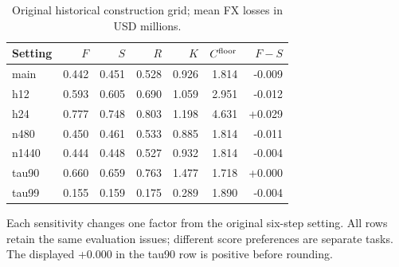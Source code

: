 \begin{table}[!htbp]
\centering\small
\caption{Original historical construction grid; mean FX losses in USD millions.}\label{tab:old}
\begin{tabular}{lrrrrrr}
\toprule
Setting & $F$ & $S$ & $R$ & $K$ & $C^{\rm floor}$ & $F-S$ \\
\midrule
main & 0.442 & 0.451 & 0.528 & 0.926 & 1.814 & -0.009 \\
h12 & 0.593 & 0.605 & 0.690 & 1.059 & 2.951 & -0.012 \\
h24 & 0.777 & 0.748 & 0.803 & 1.198 & 4.631 & +0.029 \\
n480 & 0.450 & 0.461 & 0.533 & 0.885 & 1.814 & -0.011 \\
n1440 & 0.444 & 0.448 & 0.527 & 0.932 & 1.814 & -0.004 \\
tau90 & 0.660 & 0.659 & 0.763 & 1.477 & 1.718 & +0.000 \\
tau99 & 0.155 & 0.159 & 0.175 & 0.289 & 1.890 & -0.004 \\
\bottomrule
\end{tabular}
\par\smallskip\begin{minipage}{\linewidth}\footnotesize Each sensitivity changes one factor from the original six-step setting. All rows retain the same evaluation issues; different score preferences are separate tasks. The displayed +0.000 in the tau90 row is positive before rounding.\end{minipage}
\end{table}
